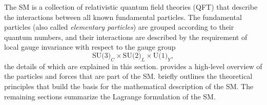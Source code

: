 

The SM is a collection of relativistic quantum field theories (QFT) that describe the interactions between all known fundamental particles.
The fundamental particles (also called \emph{elementary particles}) are grouped according to their quantum numbers, and their interactions are described by the requirement of local gauge invariance with respect to the gauge group
\begin{equation}
  \label{eq:sm-gauge-group}
  \text{SU(3)}_C \times \text{SU(2)}_L \times \text{U(1)}_Y,
\end{equation}
the details of which are explained in this section.
 provides a high-level overview of the particles and forces that are part of the SM.  briefly outlines the theoretical principles that build the basis for the mathematical description of the SM. The remaining sections summarize the Lagrange formulation of the SM.
